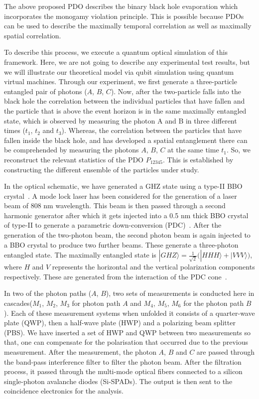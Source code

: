\documentclass[fleqn,usenatbib]{mnras}
\begin{document}
The above proposed PDO describes the binary black hole evaporation which incorporates the monogamy violation principle. This is possible because PDOs can be used to describe the maximally temporal correlation as well as maximally spatial correlation. 

To describe this process, we execute a quantum optical simulation of this framework. Here, we are not going to describe any experimental test results, but we will illustrate our theoretical model via qubit simulation using quantum virtual machines. Through our experiment, we first generate a three-particle entangled pair of photons ($A$, $B$, $C$). Now, after the two-particle falls into the black hole the correlation between the individual particles that have fallen and the particle that is above the event horizon is in the same maximally entangled state, which is observed by measuring the photon A and B in three different times ($t_1$, $t_2$ and $t_3$). Whereas, the correlation between the particles that have fallen inside the black hole, and has developed a spatial entanglement there can be comprehended by measuring the photons $A$, $B$, $C$ at the same time $t_1$. So, we reconstruct the relevant statistics of the PDO $P_{12345}$. This is established by constructing the different ensemble of the particles under study. 

In the optical schematic, we have generated a GHZ state using a type-II BBO crystal~\citep{deny}. A mode lock laser has been considered for the generation of a laser beam of 808 nm wavelength. This beam is then passed through a second harmonic generator after which it gets injected into a 0.5 nm thick BBO crystal of type-II to generate a parametric down-conversion (PDC)~\citep{rubin1,deny}. After the generation of the two-photon beam, the second photon beam is again injected to a BBO crystal to produce two further beams. These generate a three-photon entangled state. The maximally entangled state is $|GHZ\rangle = \frac{1}{\sqrt{2}} \Big(|HHH\rangle + |VVV\rangle \Big)$, where $H$ and $V$ represents the horizontal and the vertical polarization components respectively. These are generated from the interaction of the PDC cone~\citep{Genovese}. 

In two of the photon paths ($A$, $B$), two sets of measurements is conducted here in cascades($M_1$, $M_2$, $M_3$ for photon path $A$ and $M_4$, $M_5$, $M_6$ for the photon path $B$). Each of these measurement systems when unfolded it consists of a quarter-wave plate (QWP), then a half-wave plate (HWP) and a polarizing beam splitter (PBS). We have inserted a set of HWP and QWP between two measurements so that, one can compensate for the polarisation that occurred due to the previous measurement. After the measurement, the photon $A$, $B$ and $C$ are passed through the band-pass interference filter to filter the photon beam. After the filtration process, it passed through the multi-mode optical fibers connected to a silicon single-photon avalanche diodes (Si-SPADs). The output is then sent to the coincidence electronics for the analysis. 
\end{document}
